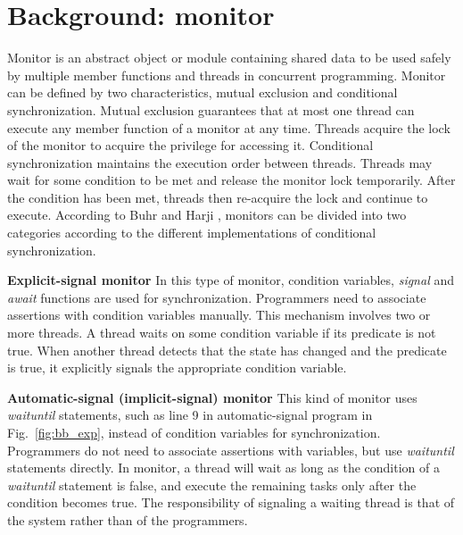 \documentclass[preprint]{sigplanconf}
\begin{document}
\section{Background: monitor} \label{sec:bg} 
Monitor is an abstract object or module containing shared data to be used safely
by multiple member functions and threads in concurrent programming. Monitor can
be defined by two characteristics, mutual exclusion and conditional 
synchronization. Mutual exclusion guarantees that at most one thread can 
execute any member function of a monitor at any time.  Threads  acquire the 
lock of the monitor to acquire the privilege for accessing it. Conditional synchronization 
maintains the execution order between threads. Threads may wait for some 
condition to be met and release the monitor lock temporarily. After the 
condition has been met, threads then re-acquire the lock and continue to 
execute. According to Buhr and Harji \cite{bh05}, monitors can be divided into 
two categories according to the different implementations of conditional 
synchronization. 
\begin{description}
    \item{\bf Explicit-signal monitor} In this type of monitor, condition
        variables, {\em signal} and {\em await} functions are used for synchronization. 
    Programmers need to associate assertions with condition variables manually.
    This mechanism involves two or more threads. A thread  waits on some condition variable 
    if its predicate is not true. When another thread detects that the state has 
    changed and the predicate is true, it explicitly signals the 
    appropriate condition variable.
    \item{\bf Automatic-signal (implicit-signal) monitor} This kind of monitor 
    uses {\em waituntil}
    statements, such as line 9 in automatic-signal program in
    Fig.~\ref{fig:bb_exp}, instead of condition variables for
    synchronization. Programmers do not need to associate assertions with
    variables, but use {\em waituntil} statements directly. In
    monitor, a thread will wait as long as the condition of a {\em waituntil}
    statement is false, and execute the remaining tasks only after the condition 
    becomes true. The responsibility of signaling a waiting thread is that of 
    the system rather than of the programmers. 
\end{description}
\end{document}
